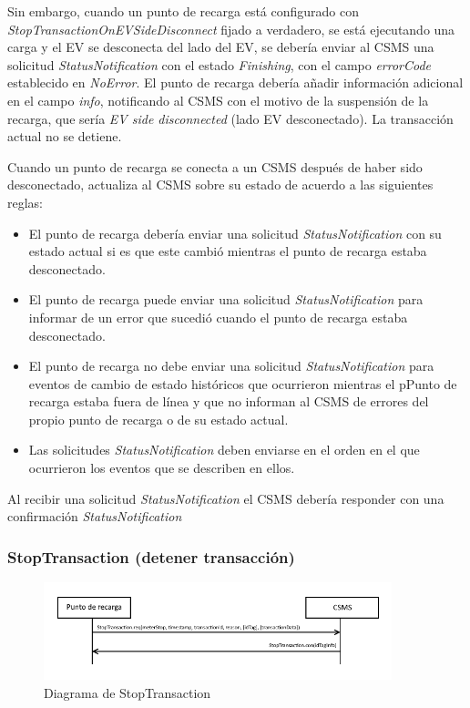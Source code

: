 \documentclass[12pt,a4paper,onecolumn,oneside]{report}
\begin{document}
Sin embargo, cuando un punto de recarga está configurado con \textit{StopTransactionOnEVSideDisconnect} fijado a verdadero, se
está ejecutando una carga y el EV se desconecta del lado del EV, se debería enviar al CSMS una solicitud \textit{StatusNotification} con el estado \textit{Finishing}, con el campo \textit{errorCode} establecido en \textit{NoError}. El punto de recarga debería añadir información adicional en el campo \textit{info}, notificando al CSMS con el motivo de la suspensión de la recarga, que sería \textit{EV side disconnected} (lado EV desconectado). La transacción actual no se detiene.

Cuando un punto de recarga se conecta a un CSMS después de haber sido desconectado, actualiza al CSMS sobre su estado de acuerdo a las siguientes reglas:

\begin{itemize}
\item El punto de recarga debería enviar una solicitud \textit{StatusNotification} con su estado actual si es que este cambió mientras el punto de recarga estaba desconectado.
\item El punto de recarga puede enviar una solicitud \textit{StatusNotification} para informar de un error que sucedió cuando el punto de recarga estaba desconectado.
\item El punto de recarga no debe enviar una solicitud \textit{StatusNotification} para eventos de cambio de estado históricos que
ocurrieron mientras el pPunto de recarga estaba fuera de línea y que no informan al CSMS de errores del propio punto de recarga o de su estado actual.
\item Las solicitudes \textit{StatusNotification} deben enviarse en el orden en el que ocurrieron los eventos que se describen en ellos.

\end{itemize}

Al recibir una solicitud \textit{StatusNotification} el CSMS debería responder con una confirmación \textit{StatusNotification}

\subsubsection{StopTransaction (detener transacción)}
\label{StopTransaction (detener transacción)}


\begin{figure}[H] 
\centering
  \includegraphics[width=0.9\textwidth]{figuras/diagramastoptransaction.png}
  \caption[Diagrama de \textit{StopTransaction}]{Diagrama de StopTransaction\\
  }
  \label{fig:diagramastoptransaction}
\end{figure}
\end{document}
